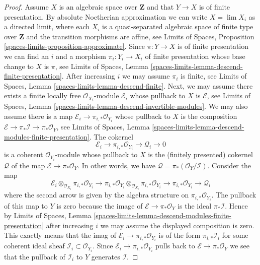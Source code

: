 \begin{proof}
\medskip\noindent
Assume $X$ is an algebraic space over $\mathbf{Z}$ and that
$Y \to X$ is of finite presentation. By absolute Noetherian
approximation we can write $X = \lim X_i$ as a directed limit,
where each $X_i$ is a quasi-separated algebraic space of finite type
over $\mathbf{Z}$ and the transition morphisms are affine, see
Limits of Spaces, Proposition \ref{spaces-limits-proposition-approximate}.
Since $\pi : Y \to X$ is of finite presentation we can find an $i$
and a morphism $\pi_i : Y_i \to X_i$ of finite presentation
whose base change to $X$ is $\pi$, see
Limits of Spaces, Lemma
\ref{spaces-limits-lemma-descend-finite-presentation}.
After increasing $i$ we may assume $\pi_i$ is finite, see
Limits of Spaces, Lemma
\ref{spaces-limits-lemma-descend-finite}.
Next, we may assume there exists a finite locally
free $\mathcal{O}_{X_i}$-module $\mathcal{E}_i$
whose pullback to $X$ is $\mathcal{E}$, see
Limits of Spaces, Lemma \ref{spaces-limits-lemma-descend-invertible-modules}.
We may also assume there is a map
$\mathcal{E}_i \to \pi_{i, *}\mathcal{O}_{Y_i}$
whose pullback to $X$ is the composition
$\mathcal{E} \to \pi_*\mathcal{I} \to \pi_*\mathcal{O}_Y$, see
Limits of Spaces, Lemma
\ref{spaces-limits-lemma-descend-modules-finite-presentation}.
The cokernel
$$
\mathcal{E}_i \to \pi_{i, *}\mathcal{O}_{Y_i} \to \mathcal{Q}_i \to 0
$$
is a coherent $\mathcal{O}_{Y_i}$-module whose pullback to $X$
is the (finitely presented) cokernel $\mathcal{Q}$ of the map
$\mathcal{E} \to \pi_*\mathcal{O}_Y$. In other words, we have
$\mathcal{Q} = \pi_*(\mathcal{O}_Y/\mathcal{I})$. Consider
the map
$$
\mathcal{E}_i
\otimes_{\mathcal{O}_{X_i}}
\pi_{i, *} \mathcal{O}_{Y_i}
\longrightarrow
\pi_{i, *}\mathcal{O}_{Y_i}
\otimes_{\mathcal{O}_{X_i}}
\pi_{i, *} \mathcal{O}_{Y_i}
\to
\pi_{i, *} \mathcal{O}_{Y_i}
\to
\mathcal{Q}_i
$$
where the second arrow is given by the algebra structure
on $\pi_{i, *}\mathcal{O}_{Y_i}$. The pullback of this map
to $Y$ is zero because the image of $\mathcal{E} \to \pi_*\mathcal{O}_Y$
is the ideal $\pi_*\mathcal{I}$. Hence by
Limits of Spaces, Lemma
\ref{spaces-limits-lemma-descend-modules-finite-presentation}
after increasing $i$ we may assume the displayed composition
is zero. This exactly means that the imag of
$\mathcal{E}_i \to \pi_{i, *}\mathcal{O}_{Y_i}$
is of the form $\pi_{i, *}\mathcal{I}_i$
for some coherent ideal sheaf $\mathcal{I}_i \subset \mathcal{O}_{Y_i}$.
Since $\mathcal{E}_i \to \pi_{i, *}\mathcal{O}_{Y_i}$
pulls back to $\mathcal{E} \to \pi_*\mathcal{O}_Y$ we
see that the pullback of $\mathcal{I}_i$ to $Y$ generates $\mathcal{I}$.

\end{proof}
